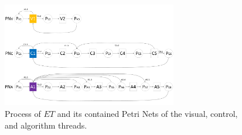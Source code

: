 \documentclass[journal,UTF8]{IEEEtran}
\begin{document}
	
	\begin{figure}
		\centering
		\includegraphics[width=3in]{fig/ThreadExecution.pdf}
		\caption{ Process of $ET$ and its contained Petri Nets of the visual, control, and algorithm threads.}
		\label{fig:threadExecution}
	\end{figure}
	
\end{document}
